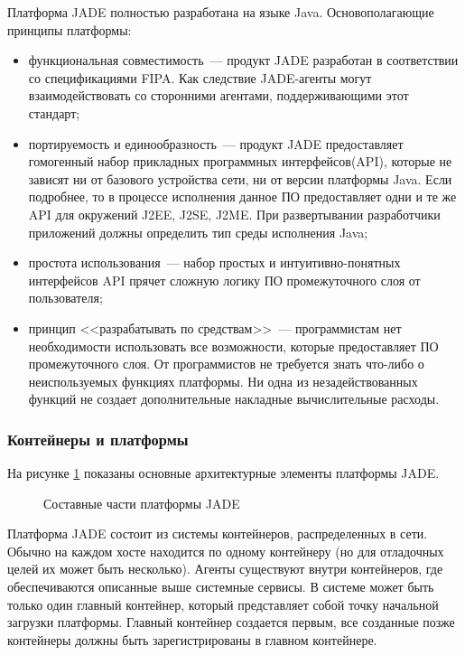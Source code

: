 Платформа JADE полностью разработана на языке Java. Основополагающие принципы платформы:
\begin{itemize}
\item функциональная совместимость~--- продукт JADE разработан в соответствии со спецификациями FIPA. Как следствие JADE-агенты могут взаимодействовать со сторонними агентами, поддерживающими этот стандарт;
\item портируемость и единообразность~--- продукт JADE предоставляет гомогенный набор прикладных программных интерфейсов(API), которые не зависят ни от базового устройства сети, ни от версии платформы Java. Если подробнее, то в процессе исполнения данное ПО предоставляет одни и те же API для окружений J2EE, J2SE, J2ME. При развертывании разработчики приложений должны определить тип среды исполнения Java;
\item простота использования~--- набор простых и интуитивно-понятных интерфейсов API прячет сложную логику ПО промежуточного слоя от пользователя;
\item принцип <<разрабатывать по средствам>>~--- программистам нет необходимости использовать все возможности, которые предоставляет ПО промежуточного слоя. От программистов не требуется знать что-либо о неиспользуемых функциях платформы. Ни одна из незадействованных функций не создает дополнительные накладные вычислительные расходы.
\end{itemize}

\subsubsection{Контейнеры и платформы}
На рисунке \ref{2:jade} показаны основные архитектурные элементы платформы JADE.
\begin{figure}[h]
\caption{Составные части платформы JADE}
\label{2:jade}
\end{figure}

Платформа JADE состоит из системы контейнеров, распределенных в сети.
Обычно на каждом хосте находится по одному контейнеру (но для отладочных целей их может быть несколько). Агенты существуют внутри контейнеров, где обеспечиваются описанные выше системные сервисы. В системе может быть только один главный контейнер, который представляет собой точку начальной загрузки платформы. Главный контейнер создается первым, все созданные позже контейнеры должны быть зарегистрированы в главном контейнере.

